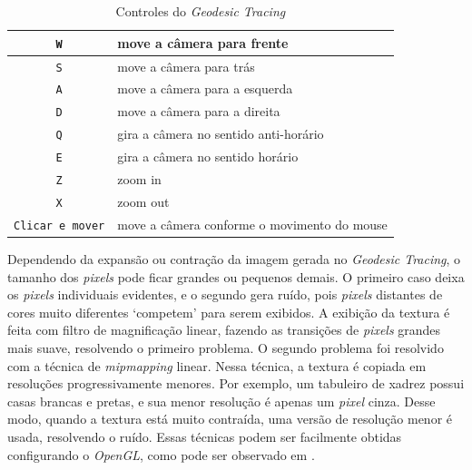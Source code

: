 \begin{table}[ht]
\caption{Controles do \textit{Geodesic Tracing}}
\label{gtctrl}
\begin{centering}
\begin{tabularx}{\textwidth}{||c|X||}
    \hline
    \texttt{W} & move a câmera para frente \\ 
    \hline
    \texttt{S} & move a câmera para trás \\
    \hline
    \texttt{A} & move a câmera para a esquerda \\
    \hline
    \texttt{D} & move a câmera para a direita \\
    \hline
    \texttt{Q} & gira a câmera no sentido anti-horário \\
    \hline
    \texttt{E} & gira a câmera no sentido horário \\
    \hline
    \texttt{Z} & zoom in \\
    \hline
    \texttt{X} & zoom out \\
    \hline
    \texttt{Clicar e mover} & move a câmera conforme o movimento do mouse \\
    \hline
\end{tabularx}
\end{centering}
\end{table}

Dependendo da expansão ou contração da imagem gerada no \textit{Geodesic Tracing},
o tamanho dos \textit{pixels} pode ficar grandes ou pequenos demais. O primeiro caso
deixa os \textit{pixels} individuais evidentes, e o segundo gera ruído, pois \textit{pixels} distantes
de cores muito diferentes `competem' para serem exibidos.
A exibição da textura é feita com filtro de magnificação linear, fazendo as transições
de \textit{pixels} grandes mais suave, resolvendo o primeiro problema.
O segundo problema foi resolvido com a técnica de \textit{mipmapping} linear.
Nessa técnica, a textura é copiada em resoluções progressivamente menores.
Por exemplo, um tabuleiro de xadrez possui casas brancas e pretas, e sua menor resolução
é apenas um \textit{pixel} cinza. Desse modo, quando a textura está muito contraída, 
uma versão de resolução menor é usada, resolvendo o ruído.
Essas técnicas podem ser facilmente obtidas configurando o \textit{OpenGL},
como pode ser observado em \cite{LearnOpenGL}.
